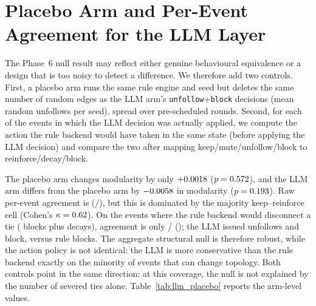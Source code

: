 \begin{table}[t]
\centering
\small
\caption{\textbf{Structural-position Bridger control.} Hub = highest degree, Bridger =
highest betweenness among non-Hubs; prototype proportions are unchanged. H2 remains
falsified in both assignments. Generated from
\texttt{results/phase1b\_structural.json} by
\texttt{scripts/generate\_paper\_tables.py}.}
\label{tab:h2_structural}

\end{table}

\section{Placebo Arm and Per-Event Agreement for the LLM Layer}
\label{app:llm-placebo}

The Phase~6 null result may reflect either genuine behavioural equivalence or a design that
is too noisy to detect a difference. We therefore add two controls. First, a placebo arm
runs the same rule engine and seed but deletes the same number of random edges as the LLM
arm's \texttt{unfollow}+\texttt{block} decisions (mean
\LlmPlaceboUnfollowsMean{} random unfollows per seed), spread over pre-scheduled rounds.
Second, for each of the \LlmRuleAgreementDecisions{} events in which the LLM decision was
actually applied, we compute the action the rule backend would have taken in the same
state (before applying the LLM decision) and compare the two after mapping
keep/mute/unfollow/block to reinforce/decay/block.

The placebo arm changes modularity by only $+0.0018$ ($p=0.572$), and the
LLM arm differs from the placebo arm by $-0.0058$ in modularity
($p=0.193$). Raw per-event agreement is \LlmRuleAgreementRate{}
(\LlmRuleAgreementAgree{}/\LlmRuleAgreementDecisions{}), but this is dominated by the
majority keep--reinforce cell (Cohen's $\kappa=0.62$). On the
\LlmSevereEvents{} events where the rule backend would disconnect a tie
(\LlmRuleBlockEvents{} blocks plus \LlmRuleDecayEvents{} decays), agreement is only
\LlmSevereAgree{}/\LlmSevereEvents{} (\LlmSevereAgreementRate); the LLM issued
\LlmArmActionUnfollow{} unfollows and \LlmArmActionBlock{} block, versus
\LlmRuleBlockEvents{} rule blocks. The aggregate structural null is therefore robust, while
the action policy is not identical: the LLM is more conservative than the rule backend
exactly on the minority of events that can change topology. Both controls point in the same
direction: at this coverage, the null is not explained by the number of severed ties alone.
Table~\ref{tab:llm_placebo} reports the arm-level values.

